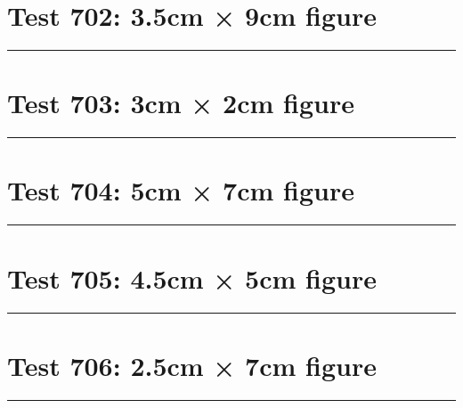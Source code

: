 \documentclass[a4paper,11pt]{article}
\begin{document}
\section*{Test 702: 3.5cm × 9cm figure}
\begin{swarmwrap}%
  \begin{minipage}[t]{3cm}
    \centering
    \rule{\linewidth}{9cm}
  \end{minipage}%
\end{swarmwrap}%
\swarmwrapnext
\lipsum[19]
\lipsum[20]
\lipsum[21]
\lipsum[22]
\lipsum[23]
\section*{Test 703: 3cm × 2cm figure}
\begin{swarmwrap}%
  \begin{minipage}[t]{3cm}
    \centering
    \rule{\linewidth}{2cm}
  \end{minipage}%
\end{swarmwrap}%
\swarmwrapnext
\lipsum[7]
\lipsum[8]
\lipsum[9]
\section*{Test 704: 5cm × 7cm figure}
\begin{swarmwrap}%
  \begin{minipage}[t]{5cm}
    \centering
    \rule{\linewidth}{7cm}
  \end{minipage}%
\end{swarmwrap}%
\swarmwrapnext
\lipsum[44]
\lipsum[45]
\lipsum[46]
\section*{Test 705: 4.5cm × 5cm figure}
\begin{swarmwrap}%
  \begin{minipage}[t]{4cm}
    \centering
    \rule{\linewidth}{5cm}
  \end{minipage}%
\end{swarmwrap}%
\swarmwrapnext
\lipsum[143]
\lipsum[144]
\lipsum[145]
\lipsum[146]
\section*{Test 706: 2.5cm × 7cm figure}
\begin{swarmwrap}%
  \begin{minipage}[t]{2cm}
    \centering
    \rule{\linewidth}{7cm}
  \end{minipage}%
\end{swarmwrap}%
\swarmwrapnext
\lipsum[120]
\lipsum[121]
\lipsum[122]
\lipsum[123]
\lipsum[124]
\lipsum[125]
\end{document}
